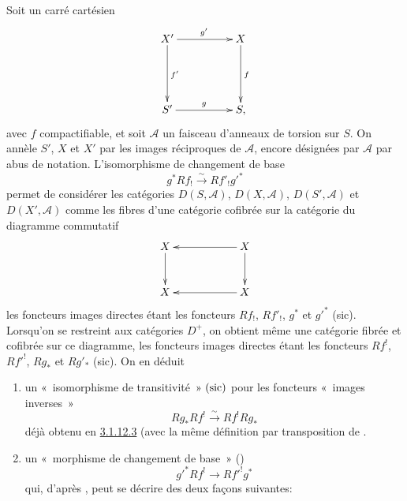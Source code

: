 \documentclass[10pt]{../fichiers-configuration-latex/smfart}
\begin{document}
\subsubsection{}
Soit un carré cartésien
$$
\xymatrix@=1.75cm{
X' \ar[r]^{g'} \ar[d]^{f'}& X \ar[d]^{f}\\
S' \ar[r]^{g}& S,
}
$$
avec $f$ compactifiable, et soit $\mathcal{A}$ un faisceau d'anneaux
de torsion sur $S$. On annèle $S'$, $X$ et $X'$ par les images
réciproques de $\mathcal{A}$, encore désignées\pageoriginale 
par $\mathcal{A}$ par abus de notation. L'isomorphisme de changement de base
\begin{equation*}
g^{\ast}Rf_{!}\xrightarrow{\sim} Rf'_{!}{g'}^{\ast}\tag{3.1.14.1}
\end{equation*}%
permet de considérer les catégories $D(S,\mathcal{A})$,
$D(X,\mathcal{A})$, $D(S',\mathcal{A})$ et $D(X',\mathcal{A})$ comme
les fibres d'une catégorie cofibrée sur la catégorie du diagramme
commutatif
$$
\xymatrix@C=2cm@R=1cm{
X \ar[d]& X\ar[l]\ar[d]\\
X & X\ar[l],
}
$$
les foncteurs images directes étant les foncteurs $Rf_{!}$, $Rf'_{!}$,
$g^{\ast}$ et ${g'}^{\ast}$ (sic). Lorsqu'on se restreint aux
catégories $D^{+}$, on obtient même une catégorie fibrée et cofibrée
sur ce diagramme, les foncteurs images directes étant les foncteurs
$Rf^{!}$, $R{f'}^{!}$, $Rg_{\ast}$ et $Rg'_{\ast}$ (sic). On en
déduit
\begin{enumerate}
\renewcommand{\theenumi}{\alph{enumi}}
\renewcommand{\labelenumi}{\theenumi)}
\item un « isomorphisme de transitivité »  $(\operatorname{sic})$ pour les
foncteurs « images inverses »
$$
Rg_{\ast} Rf^{!}\xrightarrow{\sim} Rf^{!}Rg_{\ast}
$$
déjà obtenu en \hyperref[XVIII.cor3.1.12.3]{3.1.12.3} (avec la même définition par
transposition de .

\item un « morphisme de changement de base »  ()
\begin{equation*}
{g'}^{\ast}Rf^{!}\longrightarrow R{f'}^{!}g^{\ast}\tag{3.1.14.2}
\end{equation*}%
qui, d'après \loccit, peut se décrire des deux façons suivantes:
\end{enumerate}
\end{document}
